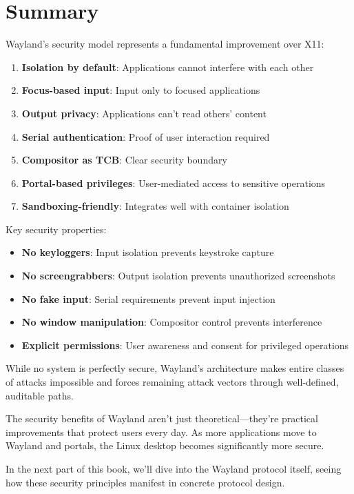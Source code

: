 \section{Summary}

Wayland's security model represents a fundamental improvement over X11:

\begin{enumerate}
    \item \textbf{Isolation by default}: Applications cannot interfere with each other
    \item \textbf{Focus-based input}: Input only to focused applications
    \item \textbf{Output privacy}: Applications can't read others' content
    \item \textbf{Serial authentication}: Proof of user interaction required
    \item \textbf{Compositor as TCB}: Clear security boundary
    \item \textbf{Portal-based privileges}: User-mediated access to sensitive operations
    \item \textbf{Sandboxing-friendly}: Integrates well with container isolation
\end{enumerate}

Key security properties:
\begin{itemize}
    \item \textbf{No keyloggers}: Input isolation prevents keystroke capture
    \item \textbf{No screengrabbers}: Output isolation prevents unauthorized screenshots
    \item \textbf{No fake input}: Serial requirements prevent input injection
    \item \textbf{No window manipulation}: Compositor control prevents interference
    \item \textbf{Explicit permissions}: User awareness and consent for privileged operations
\end{itemize}

While no system is perfectly secure, Wayland's architecture makes entire classes of attacks impossible and forces remaining attack vectors through well-defined, auditable paths.

The security benefits of Wayland aren't just theoretical—they're practical improvements that protect users every day. As more applications move to Wayland and portals, the Linux desktop becomes significantly more secure.

In the next part of this book, we'll dive into the Wayland protocol itself, seeing how these security principles manifest in concrete protocol design.

\clearpage
